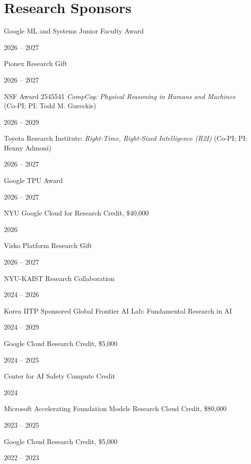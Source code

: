 \section{\sc Research Sponsors}
\newcommand{\fundingitem}[2]{\item \parbox[t]{\dimexpr\linewidth-0.85in\relax}{#1}\hfill #2}
\begin{list2}
\fundingitem{Google ML and Systems Junior Faculty Award}{2026 -- 2027}
\fundingitem{Pionex Research Gift}{2026 -- 2027}
\fundingitem{NSF Award 2545541 \emph{CompCog: Physical Reasoning in Humans and Machines} (Co-PI; PI: Todd M. Gureckis)}{2026 -- 2029}
\fundingitem{Toyota Research Institute: \emph{Right‑Time, Right‑Sized Intelligence (R2I)} (Co-PI; PI: Henny Admoni)}{2026 -- 2027}
\fundingitem{Google TPU Award}{2026 -- 2027}
\fundingitem{NYU Google Cloud for Research Credit, \$40,000}{2026}
\fundingitem{Visko Platform Research Gift}{2026 -- 2027}
\fundingitem{NYU-KAIST Research Collaboration}{2024 -- 2026}
\fundingitem{Korea IITP Sponsored Global Frontier AI Lab: Fundamental Research in AI}{2024 -- 2029}
\fundingitem{Google Cloud Research Credit, \$5,000}{2024 -- 2025}
\fundingitem{Center for AI Safety Compute Credit}{2024}
\fundingitem{Microsoft Accelerating Foundation Models Research Cloud Credit, \$80,000}{2023 -- 2025}
\fundingitem{Google Cloud Research Credit, \$5,000}{2022 -- 2023}
\end{list2}
